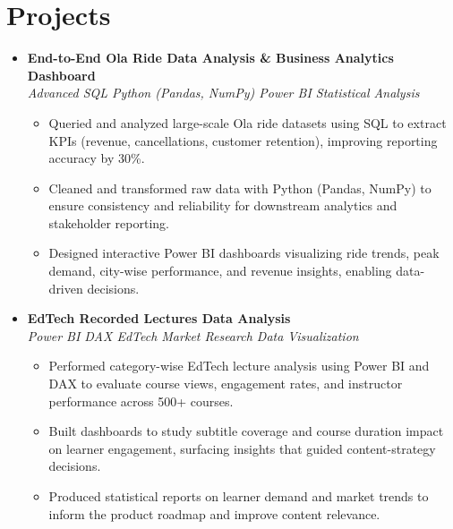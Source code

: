 \documentclass[10pt,letterpaper]{article}
\begin{document}
\section{Projects}

\begin{itemize}[leftmargin=0pt, label={}]

  \item \textbf{End-to-End Ola Ride Data Analysis \& Business Analytics Dashboard}\\
  \textit{Advanced SQL \textemdash{} Python (Pandas, NumPy) \textemdash{} Power BI \textemdash{} Statistical Analysis}
  \begin{itemize}
    \item Queried and analyzed large-scale Ola ride datasets using SQL to extract KPIs
          (revenue, cancellations, customer retention), improving reporting accuracy by 30\%.
    \item Cleaned and transformed raw data with Python (Pandas, NumPy) to ensure consistency
          and reliability for downstream analytics and stakeholder reporting.
    \item Designed interactive Power BI dashboards visualizing ride trends, peak demand,
          city-wise performance, and revenue insights, enabling data-driven decisions.
  \end{itemize}

  \item \textbf{EdTech Recorded Lectures Data Analysis}\\
  \textit{Power BI \textemdash{} DAX \textemdash{} EdTech Market Research \textemdash{} Data Visualization}
  \begin{itemize}
    \item Performed category-wise EdTech lecture analysis using Power BI and DAX to evaluate
          course views, engagement rates, and instructor performance across 500+ courses.
    \item Built dashboards to study subtitle coverage and course duration impact on learner
          engagement, surfacing insights that guided content-strategy decisions.
    \item Produced statistical reports on learner demand and market trends to inform the
          product roadmap and improve content relevance.
  \end{itemize}


\end{itemize}
\end{document}

